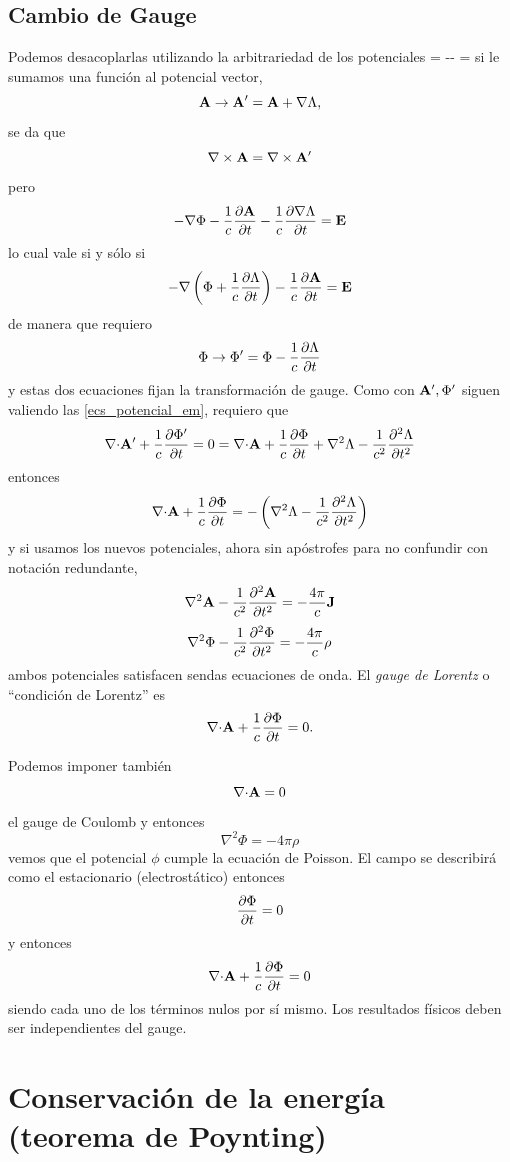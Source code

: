 \documentclass[10pt,oneside]{CBFT_book}
\begin{document}
\subsection{Cambio de Gauge}

Podemos desacoplarlas utilizando la arbitrariedad de los potenciales
\be
	 =  \qquad -\Nabla\Phi -   = 
	\label{ecs_potencial_em}
\ee
si le sumamos una función al potencial vector,
\[
	\vb{A} \rightarrow \vb{A}'= \vb{A} + \Nabla \Lambda,
\]
se da que 
\[
	\rotorm{A} = \rotorm{A'}
\]
pero
\[
	- \Nabla\Phi - \frac{1}{c}\dpar{\vb{A}}{t} - \frac{1}{c}\dpar{\Nabla\Lambda}{t} = \vb{E}
\]
lo cual vale si y sólo si
\[
	-\Nabla\left( \Phi + \frac{1}{c} \dpar{\Lambda}{t} \right) -\frac{1}{c}\dpar{\vb{A}}{t}   = \vb{E}
\]
de manera que requiero 
\[
	\Phi \rightarrow \Phi'= \Phi - \frac{1}{c} \dpar{\Lambda}{t}
\]
y estas dos ecuaciones fijan la transformación de gauge. Como con $\vb{A'}, \Phi'$ siguen valiendo las 
\eqref{ecs_potencial_em}, requiero que 
\[
	\divem{A'} + \frac{1}{c}\dpar{\Phi'}{t} = 0 = \divem{A} + \frac{1}{c}\dpar{\Phi}{t} + \nabla^2 \Lambda
	- \frac{1}{c^2} \dpar[2]{\Lambda}{t}
\]
entonces
\[
	\divem{A} + \frac{1}{c}\dpar{\Phi}{t} = -\left(\nabla^2 \Lambda - \frac{1}{c^2} \dpar[2]{\Lambda}{t}\right)
\]
y si usamos los nuevos potenciales, ahora sin apóstrofes para no confundir con notación redundante,
\[
	\nabla^2 \vb{A} - \frac{1}{c^2}\dpar[2]{\vb{A}}{t} = -\frac{4\pi}{c}\vb{J}
\]
\[
	\nabla^2 \Phi - \frac{1}{c^2}\dpar[2]{\Phi}{t} = -\frac{4\pi}{c}\rho
\]
ambos potenciales satisfacen sendas ecuaciones de onda. El {\it gauge de Lorentz} o ``condición de
Lorentz'' es
\[
	\divem{A} + \frac{1}{c} \dpar{\Phi}{t} = 0.
\]

Podemos imponer también 
\[
	\divem{A} = 0
\]
el gauge de Coulomb y entonces
\[
	\nabla^2 \Phi = -4\pi\rho
\]
vemos que el potencial $\phi$ cumple la ecuación de Poisson.
El campo se describirá como el estacionario (electrostático) entonces
\[
	\dpar{\Phi}{t} = 0
\]
y entonces
\[
	\divem{A} + \frac{1}{c} \dpar{\Phi}{t} = 0
\]
siendo cada uno de los términos nulos por sí mismo.
Los resultados físicos deben ser independientes del gauge.

\section{Conservación de la energía (teorema de Poynting)}
\end{document}
